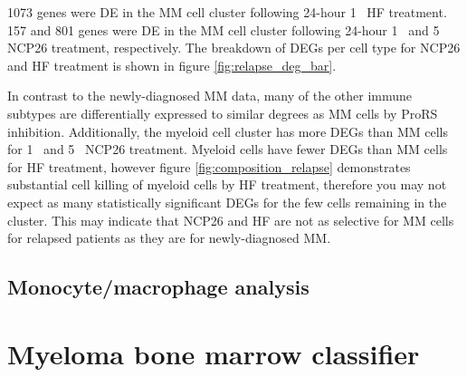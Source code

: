 1073 genes were DE in the MM cell cluster following 24-hour 1\si{\micro\Molar} HF treatment.
157 and 801 genes were DE in the MM cell cluster following 24-hour 1\si{\micro\Molar}  and 5\si{\micro\Molar} NCP26 treatment, respectively.
The breakdown of DEGs per cell type for NCP26 and HF treatment is shown in figure \ref{fig:relapse_deg_bar}.

In contrast to the newly-diagnosed MM data, many of the other immune subtypes are differentially expressed to similar degrees as MM cells by ProRS inhibition.
Additionally, the myeloid cell cluster has more DEGs than MM cells for 1\si{\micro\Molar} and 5\si{\micro\Molar}  NCP26 treatment.
Myeloid cells have fewer DEGs than MM cells for HF treatment, however figure \ref{fig:composition_relapse} demonstrates substantial cell killing of myeloid cells by HF treatment, therefore you may not expect as many statistically significant DEGs for the few cells remaining in the cluster.
This may indicate that NCP26 and HF are not as selective for MM cells for relapsed patients as they are for newly-diagnosed MM\@.



\subsection{Monocyte/macrophage analysis}

\clearpage
\section{Myeloma bone marrow classifier}